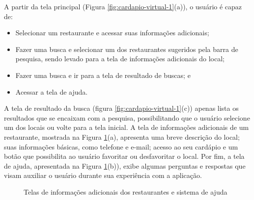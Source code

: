 A partir da tela principal (Figura \ref{fig:cardapio-virtual-1}(a)), o usuário é capaz de:
\begin{itemize}
	\item Selecionar um restaurante e acessar suas informações adicionais;
	\item Fazer uma busca e selecionar um dos restaurantes sugeridos pela barra de pesquisa, sendo levado para a tela de informações adicionais do local;
	\item Fazer uma busca e ir para a tela de resultado de buscas; e
	\item Acessar a tela de ajuda.
\end{itemize}
A tela de resultado da busca (figura \ref{fig:cardapio-virtual-1}(c)) apenas lista os resultados que se encaixam com a pesquisa, possibilitando que o usuário selecione um dos locais ou volte para a tela inicial. A tela de informações adicionais de um restaurante, mostrada na Figura \ref{fig:cardapio-virtual-2}(a), apresenta uma breve descrição do local; suas informações básicas, como telefone e e-mail; acesso ao seu cardápio e um botão que possibilita ao usuário favoritar ou desfavoritar o local. Por fim, a tela de ajuda, apresentada na Figura \ref{fig:cardapio-virtual-2}(b)), exibe algumas perguntas e respostas que visam auxiliar o usuário durante sua experiência com a aplicação.

\begin{figure}[H]
	\centering
	\caption[Telas da Aplicação 4--5]{Telas de informações adicionais dos restaurantes e sistema de ajuda}
	\label{fig:cardapio-virtual-2}
	\qquad
\end{figure}


